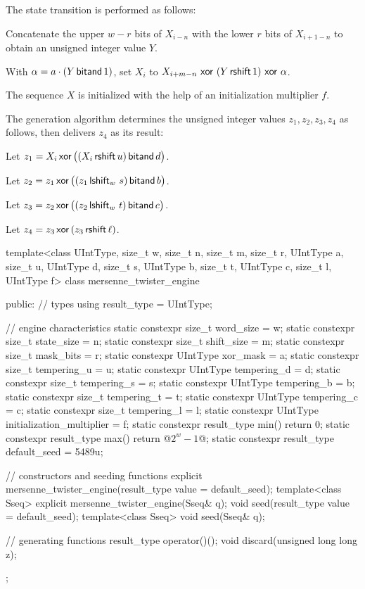The state transition is performed as follows:
\begin{enumeratea}
 \item
   Concatenate
     the upper $w-r$ bits of $X_{i-n}$
   with
     the lower $r$ bits of $X_{i+1-n}$
   to obtain an unsigned integer value $Y$.
 \item
   With $\alpha = a \cdot (Y \, \mathsf{bitand} \, 1)$,
   set $X_i$ to
     $X_{i+m-n} \, \, \mathsf{xor} \, \, (Y \, \mathsf{rshift} \, 1) \, \, \mathsf{xor} \, \, \alpha$.
\end{enumeratea}
The sequence $X$ is initialized
with the help of an initialization multiplier $f$.

\pnum
The generation algorithm%
%
 determines the unsigned integer values $z_1, z_2, z_3, z_4$ as follows,
 then delivers $z_4$ as its result:
\begin{enumeratea}
 \item
   Let $z_1 = X_i \, \mathsf{xor} \, \bigl(( X_i \, \mathsf{rshift} \, u ) \, \mathsf{bitand} \, d\bigr)$.
 \item
   Let $z_2 = z_1 \, \mathsf{xor} \, \bigl( (z_1 \, \mathsf{lshift}_w \, \, s) \, \mathsf{bitand} \, b \bigr)$.
 \item
   Let $z_3 = z_2 \, \mathsf{xor} \, \bigl( (z_2 \, \mathsf{lshift}_w \, \, t) \, \mathsf{bitand} \, c \bigr)$.
 \item
   Let $z_4 = z_3 \, \mathsf{xor} \, ( z_3 \, \mathsf{rshift} \, \ell )$.
\end{enumeratea}

\begin{codeblock}
template<class UIntType, size_t w, size_t n, size_t m, size_t r,
          UIntType a, size_t u, UIntType d, size_t s,
          UIntType b, size_t t,
          UIntType c, size_t l, UIntType f>
 class mersenne_twister_engine
{
public:
 // types
 using result_type = UIntType;

 // engine characteristics
 static constexpr size_t word_size = w;
 static constexpr size_t state_size = n;
 static constexpr size_t shift_size = m;
 static constexpr size_t mask_bits = r;
 static constexpr UIntType xor_mask = a;
 static constexpr size_t tempering_u = u;
 static constexpr UIntType tempering_d = d;
 static constexpr size_t tempering_s = s;
 static constexpr UIntType tempering_b = b;
 static constexpr size_t tempering_t = t;
 static constexpr UIntType tempering_c = c;
 static constexpr size_t tempering_l = l;
 static constexpr UIntType initialization_multiplier = f;
 static constexpr result_type min() { return 0; }
 static constexpr result_type max() { return  @$2^w - 1$@; }
 static constexpr result_type default_seed = 5489u;

 // constructors and seeding functions
 explicit mersenne_twister_engine(result_type value = default_seed);
 template<class Sseq> explicit mersenne_twister_engine(Sseq& q);
 void seed(result_type value = default_seed);
 template<class Sseq> void seed(Sseq& q);

 // generating functions
 result_type operator()();
 void discard(unsigned long long z);
};
\end{codeblock}

